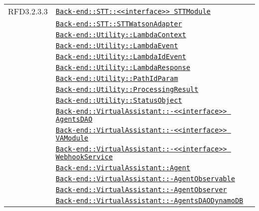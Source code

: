 \begin{longtable}{|>{\centering}m{3cm}|m{10cm}<{\centering}|}
RFD3.2.3.3 & \hyperref[Back-end::STT::<<interface>> STTModule]{\texttt{Back-end::STT::<<interface>> STTModule}}\\
& \hyperref[Back-end::STT::STTWatsonAdapter]{\texttt{Back-end::STT::STTWatsonAdapter}}\\
& \hyperref[Back-end::Utility::LambdaContext]{\texttt{Back-end::Utility::LambdaContext}}\\
& \hyperref[Back-end::Utility::LambdaEvent]{\texttt{Back-end::Utility::LambdaEvent}}\\
& \hyperref[Back-end::Utility::LambdaIdEvent]{\texttt{Back-end::Utility::LambdaIdEvent}}\\
& \hyperref[Back-end::Utility::LambdaResponse]{\texttt{Back-end::Utility::LambdaResponse}}\\
& \hyperref[Back-end::Utility::PathIdParam]{\texttt{Back-end::Utility::PathIdParam}}\\
& \hyperref[Back-end::Utility::ProcessingResult]{\texttt{Back-end::Utility::ProcessingResult}}\\
& \hyperref[Back-end::Utility::StatusObject]{\texttt{Back-end::Utility::StatusObject}}\\
& \hyperref[Back-end::VirtualAssistant::<<interface>> AgentsDAO]{\texttt{Back-end::VirtualAssistant::-\linebreak <<interface>> AgentsDAO}}\\
& \hyperref[Back-end::VirtualAssistant::<<interface>> VAModule]{\texttt{Back-end::VirtualAssistant::-\linebreak <<interface>> VAModule}}\\
& \hyperref[Back-end::VirtualAssistant::<<interface>> WebhookService]{\texttt{Back-end::VirtualAssistant::-\linebreak <<interface>> WebhookService}}\\
& \hyperref[Back-end::VirtualAssistant::Agent]{\texttt{Back-end::VirtualAssistant::Agent}}\\
& \hyperref[Back-end::VirtualAssistant::AgentObservable]{\texttt{Back-end::VirtualAssistant::-\linebreak AgentObservable}}\\
& \hyperref[Back-end::VirtualAssistant::AgentObserver]{\texttt{Back-end::VirtualAssistant::-\linebreak AgentObserver}}\\
& \hyperref[Back-end::VirtualAssistant::AgentsDAODynamoDB]{\texttt{Back-end::VirtualAssistant::-\linebreak AgentsDAODynamoDB}}\\

\end{longtable}
